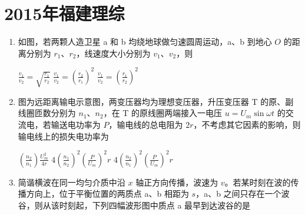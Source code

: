 \documentclass[\gkver]{gaokaozhenti}
\begin{document}
\chapter{2015年福建理综}

\begin{enumerate}
\item
如图，若两颗人造卫星 a 和 b 均绕地球做匀速圆周运动，a、b 到地心 $O$ 的距离分别为 $r_{1}$、$r_{2}$，线速度大小分别为 $v_{1}$、$v_{2}$，则


{$\frac{v_{1}}{v_{2}}=\sqrt{\frac{r_{1}}{r_{2}}}$}
{$\frac{v_{1}}{v_{2}}=\left(\frac{r_{2}}{r_{1}}\right)^{2}$}
{$\frac{v_{1}}{v_{2}}=\left(\frac{r_{1}}{r_{2}}\right)^{2}$}


\item
图为远距离输电示意图，两变压器均为理想变压器，升压变压器 T 的原、副线圈匝数分别为 $n_{1}$、$n_{2}$，在 T 的原线圈两端接入一电压 $u=U_{m}\sin\omega t$ 的交流电，若输送电功率为 $P$，输电线的总电阻为 $2r$，不考虑其它因素的影响，则输电线上的损失电功率为


{$\left(\frac{n_{2}}{n_{1}}\right)\frac{U_{m}^{2}}{4r}$}
{$4\left(\frac{n_{1}}{n_{2}}\right)^{2}\left(\frac{P}{U_{m}}\right)^{2}r$}
{$4\left(\frac{n_{2}}{n_{1}}\right)^{2}\left(\frac{P}{U_{m}}\right)^{2}r$}


\item
简谐横波在同一均匀介质中沿 $x$ 轴正方向传播，波速为 $v$。若某时刻在波的传播方向上，位于平衡位置的两质点 a、b 相距为 $s$，a、b 之间只存在一个波谷，则从该时刻起，下列四幅波形图中质点 a 最早到达波谷的是


\end{enumerate}
\end{document}
